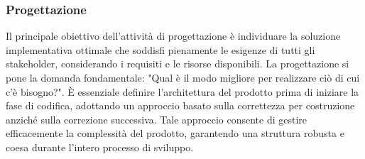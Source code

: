\subsubsection{Progettazione}
Il principale obiettivo dell'attività di progettazione è individuare la soluzione implementativa ottimale che soddisfi pienamente le esigenze di tutti gli stakeholder, considerando i requisiti e le risorse disponibili. La progettazione si pone la domanda fondamentale: "Qual è il modo migliore per realizzare ciò di cui c'è bisogno?". È essenziale definire l'architettura del prodotto prima di iniziare la fase di codifica, adottando un approccio basato sulla correttezza per costruzione anziché sulla correzione successiva. Tale approccio consente di gestire efficacemente la complessità del prodotto, garantendo una struttura robusta e coesa durante l'intero processo di sviluppo.

